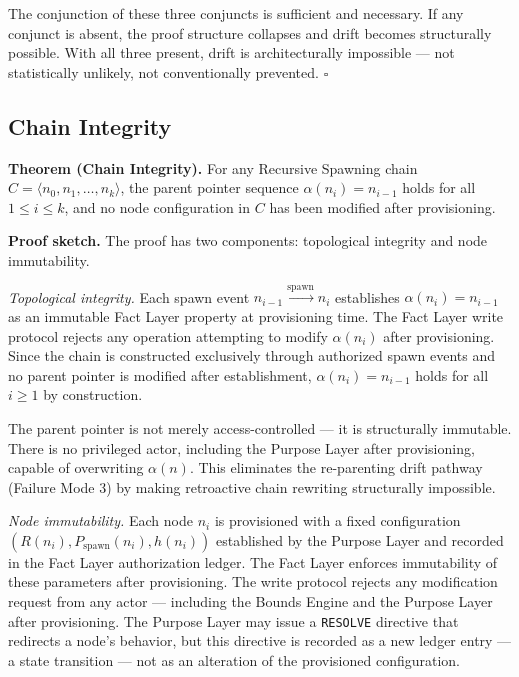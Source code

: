 The conjunction of these three conjuncts is sufficient and necessary. If any conjunct is absent, the proof structure collapses and drift becomes structurally possible. With all three present, drift is architecturally impossible --- not statistically unlikely, not conventionally prevented. $\square$

\subsection{Chain Integrity}
\label{sec:rs-chain-integrity}

\medskip
\noindent\textbf{Theorem (Chain Integrity).} For any Recursive Spawning chain $C = \langle n_0, n_1, \ldots, n_k \rangle$, the parent pointer sequence $\alpha(n_i) = n_{i-1}$ holds for all $1 \leq i \leq k$, and no node configuration in $C$ has been modified after provisioning.

\medskip
\noindent\textbf{Proof sketch.} The proof has two components: topological integrity and node immutability.

\medskip
\textit{Topological integrity.} Each spawn event $n_{i-1} \xrightarrow{\mathrm{spawn}} n_i$ establishes $\alpha(n_i) = n_{i-1}$ as an immutable Fact Layer property at provisioning time. The Fact Layer write protocol rejects any operation attempting to modify $\alpha(n_i)$ after provisioning. Since the chain is constructed exclusively through authorized spawn events and no parent pointer is modified after establishment, $\alpha(n_i) = n_{i-1}$ holds for all $i \geq 1$ by construction.

The parent pointer is not merely access-controlled --- it is structurally immutable. There is no privileged actor, including the Purpose Layer after provisioning, capable of overwriting $\alpha(n)$. This eliminates the re-parenting drift pathway (Failure Mode 3) by making retroactive chain rewriting structurally impossible.

\medskip
\textit{Node immutability.} Each node $n_i$ is provisioned with a fixed configuration $(R(n_i), P_{\mathrm{spawn}}(n_i), h(n_i))$ established by the Purpose Layer and recorded in the Fact Layer authorization ledger. The Fact Layer enforces immutability of these parameters after provisioning. The write protocol rejects any modification request from any actor --- including the Bounds Engine and the Purpose Layer after provisioning. The Purpose Layer may issue a \texttt{RESOLVE} directive that redirects a node's behavior, but this directive is recorded as a new ledger entry --- a state transition --- not as an alteration of the provisioned configuration.


